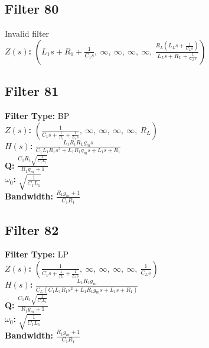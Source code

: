 \documentclass{article}
\begin{document}
\subsection*{Filter 80}
Invalid filter \\ 
\textbf{$Z(s)$:} $\left( L_{1} s + R_{1} + \frac{1}{C_{1} s}, \  \infty, \  \infty, \  \infty, \  \infty, \  \frac{R_{L} \left(L_{L} s + \frac{1}{C_{L} s}\right)}{L_{L} s + R_{L} + \frac{1}{C_{L} s}}\right)$ \\ 
\subsection*{Filter 81}
\textbf{Filter Type:} BP \\ 
\textbf{$Z(s)$:} $\left( \frac{1}{C_{1} s + \frac{1}{R_{1}} + \frac{1}{L_{1} s}}, \  \infty, \  \infty, \  \infty, \  \infty, \  R_{L}\right)$ \\ 
\textbf{$H(s)$:} $\frac{L_{1} R_{1} R_{L} g_{m} s}{C_{1} L_{1} R_{1} s^{2} + L_{1} R_{1} g_{m} s + L_{1} s + R_{1}}$ \\ 
\textbf{Q:} $\frac{C_{1} R_{1} \sqrt{\frac{1}{C_{1} L_{1}}}}{R_{1} g_{m} + 1}$ \\ 
\textbf{$\omega_0$:} $\sqrt{\frac{1}{C_{1} L_{1}}}$ \\ 
\textbf{Bandwidth:} $\frac{R_{1} g_{m} + 1}{C_{1} R_{1}}$ \\ 
\subsection*{Filter 82}
\textbf{Filter Type:} LP \\ 
\textbf{$Z(s)$:} $\left( \frac{1}{C_{1} s + \frac{1}{R_{1}} + \frac{1}{L_{1} s}}, \  \infty, \  \infty, \  \infty, \  \infty, \  \frac{1}{C_{L} s}\right)$ \\ 
\textbf{$H(s)$:} $\frac{L_{1} R_{1} g_{m}}{C_{L} \left(C_{1} L_{1} R_{1} s^{2} + L_{1} R_{1} g_{m} s + L_{1} s + R_{1}\right)}$ \\ 
\textbf{Q:} $\frac{C_{1} R_{1} \sqrt{\frac{1}{C_{1} L_{1}}}}{R_{1} g_{m} + 1}$ \\ 
\textbf{$\omega_0$:} $\sqrt{\frac{1}{C_{1} L_{1}}}$ \\ 
\textbf{Bandwidth:} $\frac{R_{1} g_{m} + 1}{C_{1} R_{1}}$ \\ 
\end{document}
